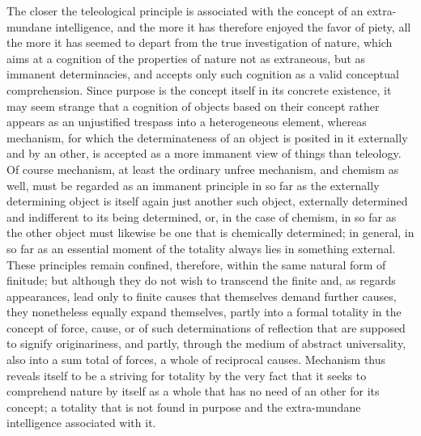 The closer the teleological principle is associated
with the concept of an extra-mundane intelligence,
and the more it has therefore enjoyed the favor of piety,
all the more it has seemed to depart from
the true investigation of nature,
which aims at a cognition of the properties of nature
not as extraneous, but as immanent determinacies,
and accepts only such cognition
as a valid conceptual comprehension.
Since purpose is the concept itself in its concrete existence,
it may seem strange that a cognition of objects
based on their concept rather appears as
an unjustified trespass into a heterogeneous element,
whereas mechanism, for which the determinateness
of an object is posited in it externally and by an other,
is accepted as a more immanent view of things than teleology.
Of course mechanism, at least the ordinary unfree mechanism,
and chemism as well, must be regarded as an immanent principle
in so far as the externally determining object
is itself again just another such object,
externally determined and indifferent to its being determined,
or, in the case of chemism, in so far as the other object
must likewise be one that is chemically determined;
in general, in so far as an essential moment
of the totality always lies in something external.
These principles remain confined, therefore,
within the same natural form of finitude;
but although they do not wish to transcend the finite
and, as regards appearances, lead only to finite causes
that themselves demand further causes,
they nonetheless equally expand themselves,
partly into a formal totality in the concept
of force, cause, or of such determinations of reflection
that are supposed to signify originariness, and partly,
through the medium of abstract universality,
also into a sum total of forces,
a whole of reciprocal causes.
Mechanism thus reveals itself to be a striving for totality
by the very fact that it seeks to comprehend nature by itself
as a whole that has no need of an other for its concept;
a totality that is not found in purpose
and the extra-mundane intelligence associated with it.


